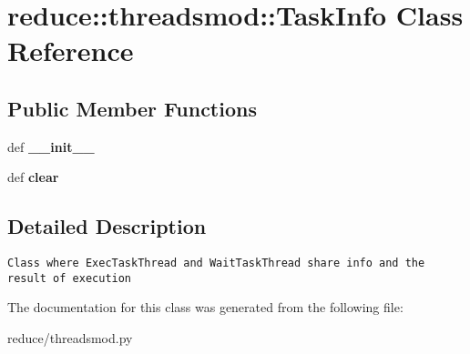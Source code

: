 \section{reduce::threadsmod::Task\-Info Class Reference}
\label{classreduce_1_1threadsmod_1_1TaskInfo}
\subsection*{Public Member Functions}
\begin{CompactItemize}
\item 
def \textbf{\_\-\_\-init\_\-\_\-}\label{classreduce_1_1threadsmod_1_1TaskInfo_f4e1c5c5065820c02fd213717712af6e}

\item 
def \textbf{clear}\label{classreduce_1_1threadsmod_1_1TaskInfo_a27e3183bf99a253c0eb9bdc70aa15d8}

\end{CompactItemize}


\subsection{Detailed Description}


\footnotesize\begin{verbatim}
Class where ExecTaskThread and WaitTaskThread share info and the result of execution
\end{verbatim}
\normalsize
 



The documentation for this class was generated from the following file:\begin{CompactItemize}
\item 
reduce/threadsmod.py\end{CompactItemize}
